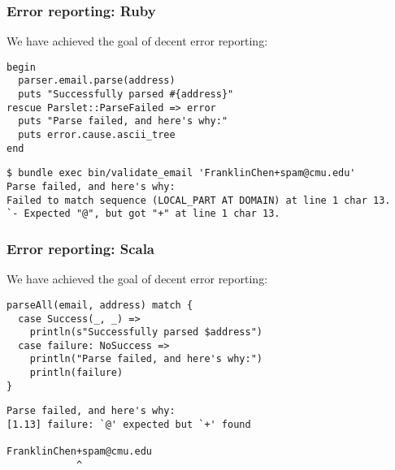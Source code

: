 \begin{frame}[fragile]
  \frametitle{Error reporting: Ruby}

  We have achieved the goal of decent error reporting:

  \begin{verbatim}
begin
  parser.email.parse(address)
  puts "Successfully parsed #{address}"
rescue Parslet::ParseFailed => error
  puts "Parse failed, and here's why:"
  puts error.cause.ascii_tree
end
  \end{verbatim}

  \begin{verbatim}
$ bundle exec bin/validate_email 'FranklinChen+spam@cmu.edu'
Parse failed, and here's why:
Failed to match sequence (LOCAL_PART AT DOMAIN) at line 1 char 13.
`- Expected "@", but got "+" at line 1 char 13.
  \end{verbatim}
\end{frame}

\begin{frame}[fragile]
  \frametitle{Error reporting: Scala}

  We have achieved the goal of decent error reporting:

  \begin{verbatim}
parseAll(email, address) match {
  case Success(_, _) =>
    println(s"Successfully parsed $address")
  case failure: NoSuccess =>
    println("Parse failed, and here's why:")
    println(failure)
}
  \end{verbatim}

  \begin{verbatim}
Parse failed, and here's why:
[1.13] failure: `@' expected but `+' found

FranklinChen+spam@cmu.edu
            ^
  \end{verbatim}
\end{frame}

